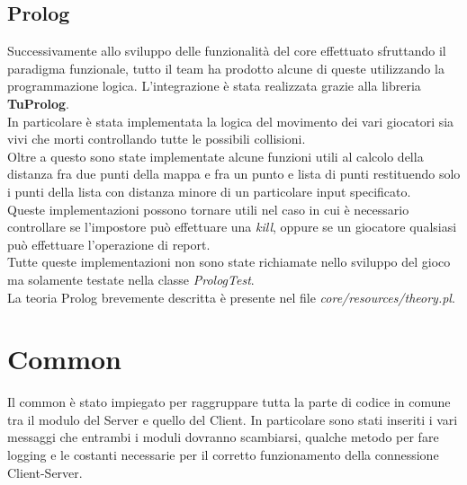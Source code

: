 \subsection{Prolog}
Successivamente allo sviluppo delle funzionalit\`a del core effettuato sfruttando il paradigma funzionale, tutto il team ha prodotto alcune di queste utilizzando la programmazione logica.
L’integrazione \`e stata realizzata grazie alla libreria \textbf{TuProlog}.\\
In particolare \`e stata implementata la logica del movimento dei vari giocatori sia vivi che morti controllando tutte le possibili collisioni.\\
Oltre a questo sono state implementate alcune funzioni utili al calcolo della distanza fra due punti della mappa e fra un punto e lista di punti restituendo solo i punti della lista  con distanza minore di un particolare input specificato.\\
Queste implementazioni possono tornare utili nel caso in cui \`e necessario controllare se l’impostore pu\`o effettuare una \textit{kill}, oppure se un giocatore qualsiasi può effettuare l’operazione di report.\\
Tutte queste implementazioni non sono state richiamate nello sviluppo del gioco ma solamente testate nella classe \textit{PrologTest}.\\
La teoria Prolog brevemente descritta \`e presente nel file \textit{core/resources/theory.pl}.

\section{Common}
Il common \`e stato impiegato per raggruppare tutta la parte di codice in comune tra il modulo del Server e quello del Client. In particolare sono stati inseriti i vari messaggi che entrambi i moduli dovranno scambiarsi, qualche metodo per fare logging e le costanti necessarie per il corretto funzionamento della connessione Client-Server.

